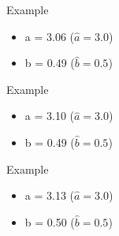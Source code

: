 \begin{frame}{Example}
  \begin{itemize}
    \item a = 3.06 ($\hat{a} = 3.0$)
    \item b = 0.49 ($\hat{b} = 0.5$)
  \end{itemize}
\end{frame}

\begin{frame}{Example}
  \begin{itemize}
    \item a = 3.10 ($\hat{a} = 3.0$)
    \item b = 0.49 ($\hat{b} = 0.5$)
  \end{itemize}
\end{frame}

\begin{frame}{Example}
  \begin{itemize}
    \item a = 3.13 ($\hat{a} = 3.0$)
    \item b = 0.50 ($\hat{b} = 0.5$)
  \end{itemize}
\end{frame}
